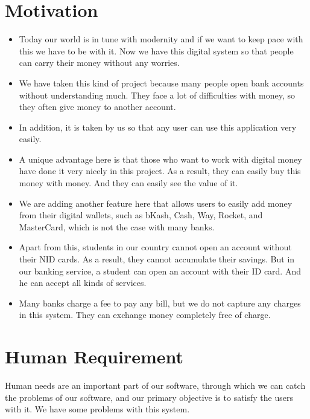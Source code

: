 \documentclass{article}
\begin{document}
\section{Motivation}
\begin{itemize}
\item Today our world is in tune with modernity and if we want to keep pace with this we have to be with it. Now we have this digital system so that people can carry their money without any worries.
\item We have taken this kind of project because many people open bank accounts without understanding much. They face a lot of difficulties with money, so they often give money to another account.
\item In addition, it is taken by us so that any user can use this application very easily.
\item A unique advantage here is that those who want to work with digital money have done it very nicely in this project. As a result, they can easily buy this money with money. And they can easily see the value of it.
\item We are adding another feature here that allows users to easily add money from their digital wallets, such as bKash, Cash, Way, Rocket, and MasterCard, which is not the case with many banks.
\item Apart from this, students in our country cannot open an account without their NID cards. As a result, they cannot accumulate their savings. But in our banking service, a student can open an account with their ID card. And he can accept all kinds of services.
\item Many banks charge a fee to pay any bill, but we do not capture any charges in this system. They can exchange money completely free of charge.

\end{itemize}


\section{Human Requirement}
Human needs are an important part of our software, through which we can catch the problems of our software, and our primary objective is to satisfy the users with it. We have some problems with this system.
\end{document}
